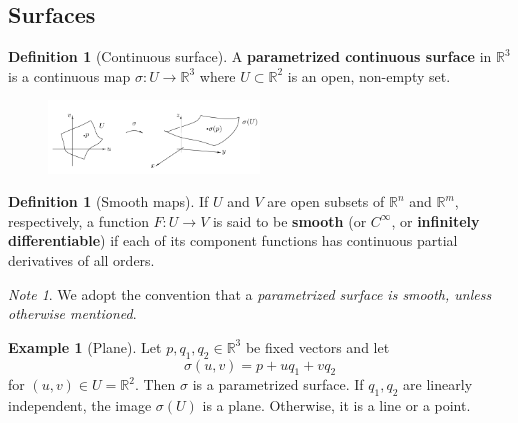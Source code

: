 \documentclass[reqno]{amsart}
\theoremstyle{plain}%
\theoremstyle{definition}
\newtheorem{definition}[theorem]{Definition}
\newtheorem{example}[theorem]{Example}
\theoremstyle{remark}
\newtheorem*{note}{Note}
\begin{document}
\subsection{Surfaces}
\begin{definition}[Continuous surface]
    A \textbf{parametrized continuous surface} in $\mathbb{R}^3$ is
    a continuous map $\sigma  \colon U \to \mathbb{R}^3$ where
    $U \subset \mathbb{R}^2$ is an open, non-empty set.
    \begin{figure}[H]
        \centering
        \includegraphics[width=0.5\textwidth]{surface.png}
        \label{fig:surface-png}
    \end{figure}
\end{definition}
\begin{definition}[Smooth maps]
    If $U$ and  $V$ are open subsets of $\mathbb{R}^{n}$ 
    and $\mathbb{R}^{m}$, respectively, a function
    $F  \colon U \to V$ is said to be \textbf{smooth}
    (or  \textbf{$C^{\infty}$}, or \textbf{infinitely differentiable}) if each
    of its component functions has continuous partial derivatives of all
    orders.
\end{definition}
\begin{note}
    We adopt the convention that a \textit{parametrized surface is smooth,
    unless otherwise mentioned}.
\end{note}
\begin{example}[Plane]
    Let $p, q_1, q_2 \in \mathbb{R}^3$ be fixed vectors and let
    \[
    \sigma \left( u,v \right) = p + uq_1 + vq_2
    \] 
    for $\left( u,v \right) \in U = \mathbb{R}^2$. Then
    $\sigma$ is a parametrized surface. If $q_1, q_2$ are linearly independent,
    the image $\sigma(U)$ is a plane. Otherwise, it is a line or a point.
\end{example}
\end{document}
